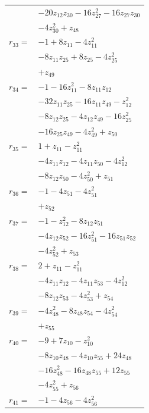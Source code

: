 \begin{longtable}{@{}r@{\;}l@{}}
 & \(\displaystyle -20z_{12}z_{30} -16z_{27}^{2} -16z_{27}z_{30}\) \\
 & \(\displaystyle -4z_{30}^{2} +z_{48}\) \\[3pt]
\(r_{33}=\) & \(\displaystyle -1 +8z_{11} -4z_{11}^{2}\) \\
 & \(\displaystyle -8z_{11}z_{25} +8z_{25} -4z_{25}^{2}\) \\
 & \(\displaystyle +z_{49}\) \\[3pt]
\(r_{34}=\) & \(\displaystyle -1 -16z_{11}^{2} -8z_{11}z_{12}\) \\
 & \(\displaystyle -32z_{11}z_{25} -16z_{11}z_{49} -z_{12}^{2}\) \\
 & \(\displaystyle -8z_{12}z_{25} -4z_{12}z_{49} -16z_{25}^{2}\) \\
 & \(\displaystyle -16z_{25}z_{49} -4z_{49}^{2} +z_{50}\) \\[3pt]
\(r_{35}=\) & \(\displaystyle 1 +z_{11} -z_{11}^{2}\) \\
 & \(\displaystyle -4z_{11}z_{12} -4z_{11}z_{50} -4z_{12}^{2}\) \\
 & \(\displaystyle -8z_{12}z_{50} -4z_{50}^{2} +z_{51}\) \\[3pt]
\(r_{36}=\) & \(\displaystyle -1 -4z_{51} -4z_{51}^{2}\) \\
 & \(\displaystyle +z_{52}\) \\[3pt]
\(r_{37}=\) & \(\displaystyle -1 -z_{12}^{2} -8z_{12}z_{51}\) \\
 & \(\displaystyle -4z_{12}z_{52} -16z_{51}^{2} -16z_{51}z_{52}\) \\
 & \(\displaystyle -4z_{52}^{2} +z_{53}\) \\[3pt]
\(r_{38}=\) & \(\displaystyle 2 +z_{11} -z_{11}^{2}\) \\
 & \(\displaystyle -4z_{11}z_{12} -4z_{11}z_{53} -4z_{12}^{2}\) \\
 & \(\displaystyle -8z_{12}z_{53} -4z_{53}^{2} +z_{54}\) \\[3pt]
\(r_{39}=\) & \(\displaystyle -4z_{48}^{2} -8z_{48}z_{54} -4z_{54}^{2}\) \\
 & \(\displaystyle +z_{55}\) \\[3pt]
\(r_{40}=\) & \(\displaystyle -9 +7z_{10} -z_{10}^{2}\) \\
 & \(\displaystyle -8z_{10}z_{48} -4z_{10}z_{55} +24z_{48}\) \\
 & \(\displaystyle -16z_{48}^{2} -16z_{48}z_{55} +12z_{55}\) \\
 & \(\displaystyle -4z_{55}^{2} +z_{56}\) \\[3pt]
\(r_{41}=\) & \(\displaystyle -1 -4z_{56} -4z_{56}^{2}\) \\

\end{longtable}
